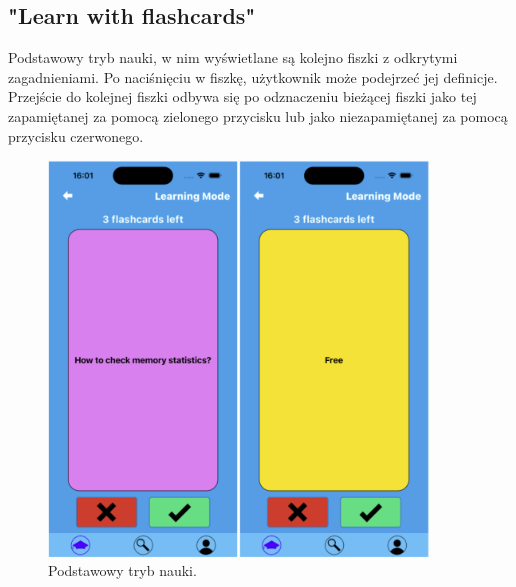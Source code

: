 \subsection{"Learn with flashcards"}
Podstawowy tryb nauki, w nim wyświetlane są kolejno fiszki z odkrytymi zagadnieniami. Po naciśnięciu w fiszkę, użytkownik może podejrzeć jej definicje. Przejście do kolejnej fiszki odbywa się po odznaczeniu bieżącej fiszki jako tej zapamiętanej za pomocą zielonego przycisku lub jako niezapamiętanej za pomocą przycisku czerwonego.


\begin{figure}[H]
    \centering
    \includegraphics[width=0.9\textwidth]{chapters/chapter_10/images_mobile/mobile_learn}
    \caption{Podstawowy tryb nauki.}
    \label{img:mobile_learn}
\end{figure}


